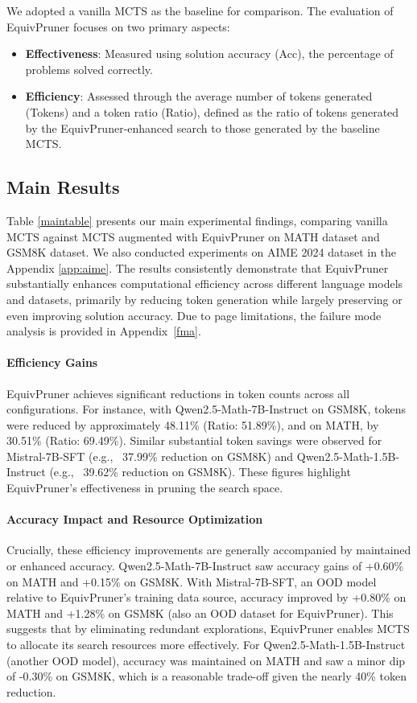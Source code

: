\documentclass[11pt]{article}
\begin{document}
We adopted a vanilla MCTS \citep{chenalphamath} as the baseline for comparison. The evaluation of EquivPruner focuses on two primary aspects:
\begin{itemize}
\item \textbf{Effectiveness}: Measured using solution accuracy (Acc), the percentage of problems solved correctly.
\item \textbf{Efficiency}: Assessed through the average number of tokens generated (Tokens) and a token ratio (Ratio), defined as the ratio of tokens generated by the EquivPruner-enhanced search to those generated by the baseline MCTS.
\end{itemize}

\subsection{Main Results}
\label{subsec:Main_Results}
Table \ref{maintable} presents our main experimental findings, comparing vanilla MCTS against MCTS augmented with EquivPruner on MATH dataset and GSM8K dataset. We also conducted experiments on AIME 2024 dataset in the Appendix \ref{app:aime}. The results consistently demonstrate that EquivPruner substantially enhances computational efficiency across different language models and datasets, primarily by reducing token generation while largely preserving or even improving solution accuracy.
Due to page limitations, the failure mode analysis is provided in Appendix~\ref{fma}.
\paragraph{Efficiency Gains}
EquivPruner achieves significant reductions in token counts across all configurations. For instance, with Qwen2.5-Math-7B-Instruct on GSM8K, tokens were reduced by approximately 48.11\% (Ratio: 51.89\%), and on MATH, by 30.51\% (Ratio: 69.49\%). Similar substantial token savings were observed for Mistral-7B-SFT (e.g., ~37.99\% reduction on GSM8K) and Qwen2.5-Math-1.5B-Instruct (e.g., ~39.62\% reduction on GSM8K). These figures highlight EquivPruner's effectiveness in pruning the search space.

\paragraph{Accuracy Impact and Resource Optimization}
Crucially, these efficiency improvements are generally accompanied by maintained or enhanced accuracy. Qwen2.5-Math-7B-Instruct saw accuracy gains of +0.60\% on MATH and +0.15\% on GSM8K. With Mistral-7B-SFT, an OOD model relative to EquivPruner's training data source, accuracy improved by +0.80\% on MATH and +1.28\% on GSM8K (also an OOD dataset for EquivPruner). This suggests that by eliminating redundant explorations, EquivPruner enables MCTS to allocate its search resources more effectively. For Qwen2.5-Math-1.5B-Instruct (another OOD model), accuracy was maintained on MATH and saw a minor dip of -0.30\% on GSM8K, which is a reasonable trade-off given the nearly 40\% token reduction.
\end{document}
